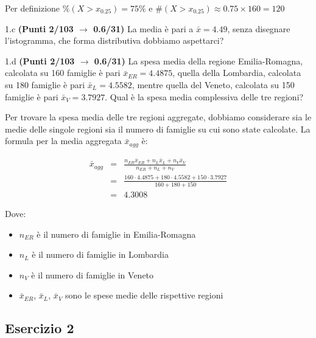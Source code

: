 \documentclass[
  11pt,
]{book}
\providecommand{\tightlist}{%
  \setlength{\itemsep}{0pt}\setlength{\parskip}{0pt}}
\theoremstyle{mytheoremstyle}
\theoremstyle{mydefstyle}
\newenvironment{sol}
  {
  \begin{tcolorbox}[enhanced,breakable,arc=0.1mm,boxrule=1pt,colback=white,colframe=iblue,
  title=\bf \fontfamily{lmss}\selectfont \hspace{.5 cm} Soluzione,drop fuzzy shadow]

}{
\end{tcolorbox}
  }
\begin{document}
\begin{sol}
Per definizione \(\%(X>x_{0.25})=75\%\) e
\(\#(X>x_{0.25})\approx0.75\times160 =120\)

\end{sol}

1.c \textbf{(Punti 2/103 \(\rightarrow\) 0.6/31)} La media è pari a \(\bar x=4.49\), senza disegnare l'istogramma, che forma distributiva dobbiamo aspettarci?

1.d \textbf{(Punti 2/103 \(\rightarrow\) 0.6/31)} La spesa media della regione Emilia-Romagna, calcolata su 160 famiglie è pari \(\bar x_{ER}=4.4875\), quella della Lombardia, calcolata su 180 famiglie è pari \(\bar x_{L}=4.5582\), mentre quella del Veneto, calcolata su 150 famiglie è pari \(\bar x_{V}=3.7927\). Qual è la spesa media complessiva delle tre regioni?

\begin{sol}

Per trovare la spesa media delle tre regioni aggregate, dobbiamo considerare sia le medie delle singole regioni sia il numero di famiglie su cui sono state calcolate. La formula per la media aggregata \(\bar{x}_{agg}\) è:

\begin{eqnarray*}
\bar{x}_{agg}    &=&  \frac{n_{ER} \bar{x}_{ER} + n_{L} \bar{x}_{L} + n_{V} \bar{x}_{V}}{n_{ER} + n_{L} + n_{V}}\\
&=& \frac{160\cdot4.4875+180\cdot4.5582+150\cdot3.7927}{160+180+150}\\
&=& 4.3008
\end{eqnarray*}

Dove:

\begin{itemize}
\tightlist
\item
  \(n_{ER}\) è il numero di famiglie in Emilia-Romagna
\item
  \(n_{L}\) è il numero di famiglie in Lombardia
\item
  \(n_{V}\) è il numero di famiglie in Veneto
\item
  \(\bar{x}_{ER}\), \(\bar{x}_{L}\), \(\bar{x}_{V}\) sono le spese medie delle rispettive regioni
\end{itemize}

\end{sol}

\subsection{Esercizio 2}\label{esercizio-2-38}
\end{document}
